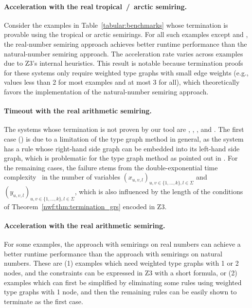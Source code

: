 \paragraph{Acceleration with the real tropical~/~arctic semiring.} 
Consider the examples in Table~\ref{tabular:benchmarks} whose termination is provable using the tropical or arctic semirings. For all such examples except \cite[Example 5]{plump2018modular} and \cite[Example 4]{bruggink2015proving}, the real-number semiring approach achieves better runtime performance than the natural-number semiring approach. The acceleration rate varies across examples due to Z3's internal heuristics. This result is notable because termination proofs for these systems only require weighted type graphs with small edge weights (e.g., values less than 2 for most examples and at most 3 for all), which theoretically favors the implementation of the natural-number semiring approach.

\paragraph{Timeout with the real arithmetic semiring.}
The systems whose termination is not proven by our tool are \cite[Example 6]{plump2018modular}, \cite[Examples 5 and 6]{bruggink2015proving}, \cite[Example 4]{plump2018modular}, and \cite[Example 5]{bruggink2014termination}.
The first case (\cite[Example 6]{plump2018modular}) is due to a limitation of the type graph method in general, as the system has a rule whose right-hand side graph can be embedded into its left-hand side graph, which is problematic for the type graph method as pointed out in \cite[Example D.4]{endrullis2024generalized_arxiv_v2}. For the remaining cases,
 the failure stems from the double-exponential time complexity~\cite{collins1974quantifier,z3realarithmetic} in the number of variables \( (x_{u,v,l})_{u,v \in \{1,...,k\}, l \in \Sigma} \) and \( (y_{u,v,l})_{u,v \in \{1,...,k\}, l \in \Sigma} \), which is also influenced by the length of the conditions of Theorem~\ref{nwf:thm:termination_grs} encoded in Z3.
\paragraph{Acceleration with the real arithmetic semiring.} For some examples, the approach with semirings on real numbers can achieve a better runtime performance than the approach with semirings on natural numbers. These are (1) examples which need weighted type graphs with 1 or 2 nodes, and the constraints can be expressed in Z3 with a short formula, or (2) examples which can first be simplified by eliminating some rules using weighted type graphs with 1 node, and then the remaining rules can be 
easily shown to terminate
as the first case.
